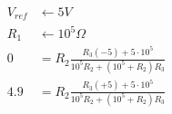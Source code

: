 \documentclass{article}
\begin{document}
\thispagestyle{empty}

\begin{align*}
V_{ref} & \leftarrow 5 V\\
R_1 & \leftarrow 10^5 \Omega\\
0   & = R_2\frac{R_{3} (-5) + 5\cdot 10^5}{10^5 R_{2} + {\left(10^5 + R_{2}\right)} R_{3}}\\
4.9 & = R_2\frac{R_{3} (+5) + 5\cdot 10^5}{10^5 R_{2} + {\left(10^5 + R_{2}\right)} R_{3}}\\
\end{align*}
\end{document}
